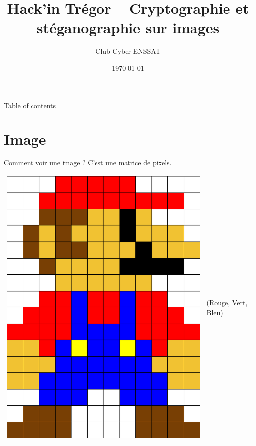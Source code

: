 \documentclass{beamer}
\title{Hack'in Trégor -- Cryptographie et stéganographie sur images}
\author{Club Cyber ENSSAT}
\date{\today}
\begin{document}
    \frame{\titlepage}

    \begin{frame}{Table of contents}
        \tableofcontents
    \end{frame}

    \section{Image}

    \begin{frame}{Comment voir une image ?}%
        C'est une matrice de pixels.

        \begin{center}
            \begin{tabular}{cp{200pt}}
                \includegraphics[scale=.17]{pics/pixels.png}
                &
                \vspace{-150pt}
                (Rouge, Vert, Bleu)


\end{tabular}
\end{center}
\end{frame}
\end{document}
